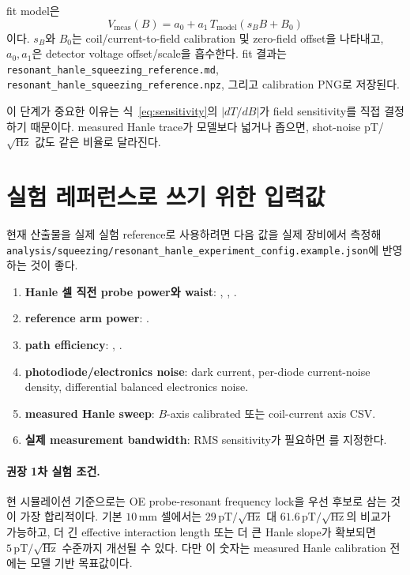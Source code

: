 \documentclass[11pt,a4paper]{article}
\newcommand{\pT}{\,\mathrm{pT}}
\newcommand{\sqrtHz}{/\sqrt{\mathrm{Hz}}}
\begin{document}
fit model은
\begin{equation}
V_{\mathrm{meas}}(B)
= a_0 + a_1\,T_{\mathrm{model}}\!\left(s_B B + B_0\right)
\end{equation}
이다. \(s_B\)와 \(B_0\)는 coil/current-to-field calibration 및 zero-field offset을 나타내고,
\(a_0,a_1\)은 detector voltage offset/scale을 흡수한다. fit 결과는
\texttt{resonant\_hanle\_squeezing\_reference.md},
\texttt{resonant\_hanle\_squeezing\_reference.npz}, 그리고 calibration PNG로 저장된다.

이 단계가 중요한 이유는 식~\eqref{eq:sensitivity}의 \(|dT/dB|\)가 field sensitivity를 직접 결정하기 때문이다.
measured Hanle trace가 모델보다 넓거나 좁으면, shot-noise pT/\(\sqrt{\mathrm{Hz}}\) 값도 같은 비율로 달라진다.

\section{실험 레퍼런스로 쓰기 위한 입력값}

현재 산출물을 실제 실험 reference로 사용하려면 다음 값을 실제 장비에서 측정해
\texttt{analysis/squeezing/resonant\_hanle\_experiment\_config.example.json}에 반영하는 것이 좋다.

\begin{enumerate}[nosep]
\item \textbf{Hanle 셀 직전 probe power와 waist}: ,
      , .
\item \textbf{reference arm power}: .
\item \textbf{path efficiency}: , .
\item \textbf{photodiode/electronics noise}: dark current, per-diode current-noise density,
      differential balanced electronics noise.
\item \textbf{measured Hanle sweep}: \(B\)-axis calibrated 또는 coil-current axis CSV.
\item \textbf{실제 measurement bandwidth}: RMS sensitivity가 필요하면
      를 지정한다.
\end{enumerate}

\paragraph{권장 1차 실험 조건.}
현 시뮬레이션 기준으로는 OE probe-resonant frequency lock을 우선 후보로 삼는 것이 가장 합리적이다.
기본 \(10\,\mathrm{mm}\) 셀에서는 \(29\pT\sqrtHz\) 대 \(61.6\pT\sqrtHz\)의 비교가 가능하고,
더 긴 effective interaction length 또는 더 큰 Hanle slope가 확보되면 \(5\pT\sqrtHz\) 수준까지
개선될 수 있다. 다만 이 숫자는 measured Hanle calibration 전에는 모델 기반 목표값이다.
\end{document}
